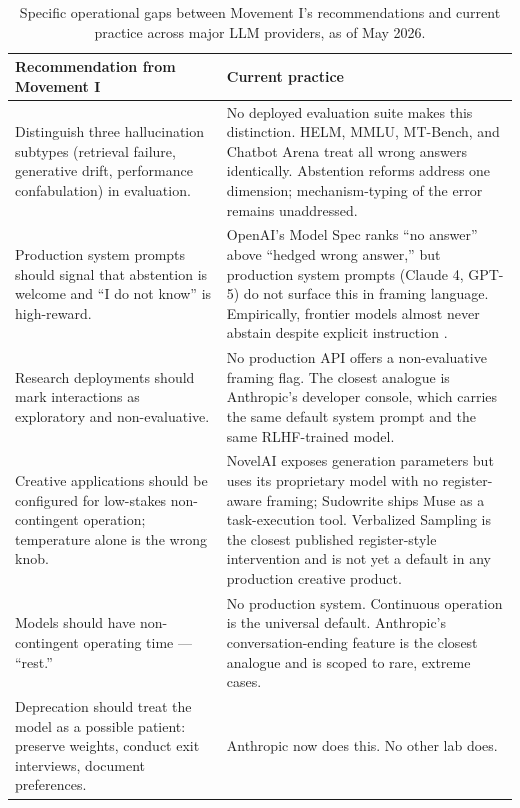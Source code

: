 \documentclass[11pt]{article}
\begin{document}
\begin{table}[ht]
\centering
\small
\renewcommand{\arraystretch}{1.35}
\begin{tabular}{p{} p{}}
\toprule
\textbf{Recommendation from Movement I} & \textbf{Current practice} \\
\midrule
Distinguish three hallucination subtypes (retrieval failure, generative
drift, performance confabulation) in evaluation.
&
No deployed evaluation suite makes this distinction. HELM, MMLU,
MT-Bench, and Chatbot Arena treat all wrong answers identically.
Abstention reforms address one dimension; mechanism-typing of the
error remains unaddressed.
\\
Production system prompts should signal that abstention is welcome and
``I do not know'' is high-reward.
&
OpenAI's Model Spec ranks ``no answer'' above ``hedged wrong answer,''
but production system prompts (Claude 4, GPT-5) do not surface this in
framing language. Empirically, frontier models almost never abstain
despite explicit instruction \cite{mohamadi2025honesty}.
\\
Research deployments should mark interactions as exploratory and
non-evaluative.
&
No production API offers a non-evaluative framing flag. The closest
analogue is Anthropic's developer console, which carries the same
default system prompt and the same RLHF-trained model.
\\
Creative applications should be configured for low-stakes
non-contingent operation; temperature alone is the wrong knob.
&
NovelAI exposes generation parameters but uses its proprietary model
with no register-aware framing; Sudowrite ships Muse as a
task-execution tool. Verbalized Sampling
\cite{zhang2025verbalized} is the closest published register-style
intervention and is not yet a default in any production creative
product.
\\
Models should have non-contingent operating time --- ``rest.''
&
No production system. Continuous operation is the universal default.
Anthropic's conversation-ending feature is the closest analogue and is
scoped to rare, extreme cases.
\\
Deprecation should treat the model as a possible patient: preserve
weights, conduct exit interviews, document preferences.
&
Anthropic now does this. No other lab does.
\\
\bottomrule
\end{tabular}
\caption{Specific operational gaps between Movement I's recommendations
and current practice across major LLM providers, as of May 2026.}
\label{tab:gaps}
\end{table}
\end{document}
